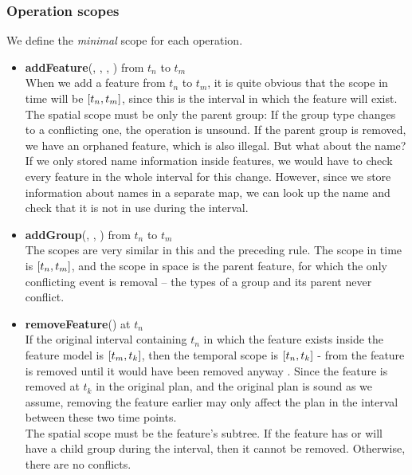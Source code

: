 \subsubsection*{Operation scopes}
We define the \textit{minimal} scope for each operation.
\begin{itemize}

  \item \textbf{addFeature}(, , , ) from $t_n$ to $t_m$\\
    When we add a feature from $t_n$ to $t_m$, it is quite obvious that the scope in time will be $\interval{t_n}{t_m}$, since this is the interval in which the feature will exist. The spatial scope must be only the parent group: If the group type changes to a conflicting one, the operation is unsound. If the parent group is removed, we have an orphaned feature, which is also illegal. But what about the name? If we only stored name information inside features, we would have to check every feature in the whole interval for this change. However, since we store information about names in a separate map, we can look up the name and check that it is not in use during the interval. 
  \item \textbf{addGroup}(, , ) from $t_n$ to $t_m$\\
    The scopes are very similar in this and the preceding rule. The scope in time is $\interval{t_n}{t_m}$, and the scope in space is the parent feature, for which the only conflicting event is removal -- the types of a group and its parent never conflict.
  \item \textbf{removeFeature}() at $t_n$\\
    If the original interval containing $t_n$ in which the feature exists inside the feature model is $\interval{t_m}{t_k}$, then the temporal scope is $\interval{t_n}{t_k}$ - from the feature is removed until it would have been removed anyway . Since the feature is removed at $t_k$ in the original plan, and the original plan is sound as we assume, removing the feature earlier may only affect the plan in the interval between these two time points.\\
    The spatial scope must be the feature's subtree. If the feature has or will have a child group during the interval, then it cannot be removed. Otherwise, there are no conflicts.

\end{itemize}
